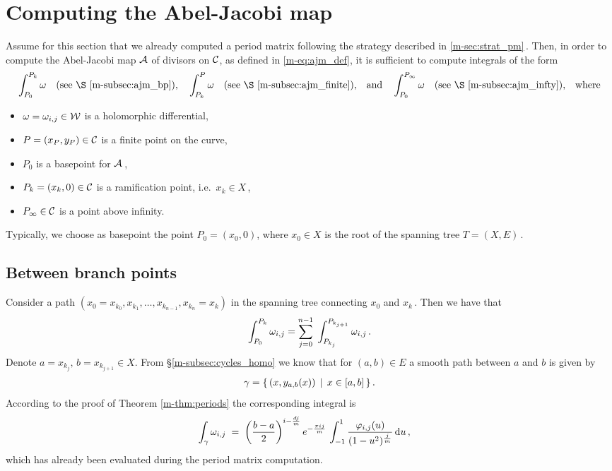 \documentclass[main.tex]{subfiles}
\begin{document}
  \section{Computing the Abel-Jacobi map}\label{sec:comp_ajm}
  
   Assume for this section that we already computed a period matrix following the strategy described in \ref{m-sec:strat_pm}\,.
   Then, in order to compute the Abel-Jacobi map  $\mathcal{A}$ of divisors on $\mathcal{C}$, as defined in \eqref{m-eq:ajm_def}, it is sufficient to compute integrals of the form
  \begin{align*}
    \int_{P_0}^{P_k} \w\quad \text{(see \S \ref{m-subsec:ajm_bp}),} \quad
    \int_{P_k}^{P} \w \quad \text{(see \S \ref{m-subsec:ajm_finite}),}
    \quad \text{and} \quad \int_{P_0}^{P_{\infty}} \w\quad \text{(see \S \ref{m-subsec:ajm_infty}),} \quad \text{where}
  \end{align*}
  
  \begin{itemize}
   \item $\omega = \omega_{i,j}\in \mathcal{W}$ is a holomorphic differential,
   \item $P = (x_P,y_P) \in \mathcal{C}$ is a finite point on the curve,
   \item $P_0$ is a basepoint for $\mathcal{A}$\,,
   \item $P_k = (x_k,0) \in \mathcal{C}$ is a ramification point, i.e.\ $x_k \in X$\,,
   \item $P_{\infty} \in \mathcal{C}$ is a point above infinity.
  \end{itemize}
  
  Typically, we choose as basepoint the point $P_0 = (x_0,0)$, where $x_0 \in X$ is the root of the spanning tree $T = (X,E)$\,.

  \subsection{Between branch points}\label{subsec:ajm_bp}

  Consider a path $(x_0=x_{k_0},x_{k_1},\dots,x_{k_{n-1}},x_{k_n}=x_k)$ in the spanning tree connecting $x_0$ and $x_k$\,. Then we have that
  \begin{align}
    \int_{P_0}^{P_k} \omega_{i,j} = \sum_{j = 0}^{n-1} \; \int_{P_{k_j}}^{P_{k_{j+1}}} \omega_{i,j}\,.
  \end{align}
  Denote $a = x_{k_j},\, b = x_{k_{j+1}} \in X$. From \S \ref{m-subsec:cycles_homo} we know that for $(a,b) \in E$ a smooth path between $a$ and $b$ is given by
  \begin{align*}
   \gamma = \{ \, (x,y_{a,b}(x)) \, \mid \, x \in [a,b] \, \}\,.
  \end{align*}
  According to the proof of Theorem \ref{m-thm:periods} the corresponding integral is
  \begin{align}
   \int_{\gamma} \omega_{i,j} \; & = \; \left(\frac{b-a}{2}\right)^{i-\frac{dj}{m}} e^{-\frac{\pi i j}{m}} \, \int_{-1}^1 \frac{\varphi_{i,j}(u)}{(1-u^2)^{\frac{j}{m}}}\, \mathrm d u \,,
  \end{align}
  which has already been evaluated during the period matrix computation.
\end{document}
